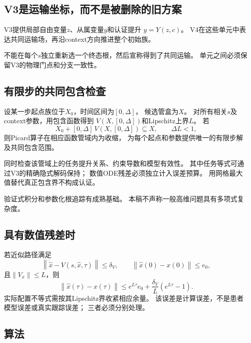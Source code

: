 \documentclass[UTF8,11pt,a4paper,fontset=fandol]{ctexart}
\numberwithin{equation}{section}
\theoremstyle{definition}
\newcommand{\norm}[1]{\left\lVert#1\right\rVert}
\begin{document}
\subsection{V3是运输坐标，而不是被删除的旧方案}

V3提供局部自由变量$z$、从属变量$y$和认证提升
$y=Y(z,c)$。
V4在这些单元中表达共同运输场，再沿context方向推进整个初始族。

不能在每个$s$独立重新选一个终态根，然后宣称得到了共同运输。
单元之间必须保留V3的物理门点和分支一致性。

\subsection{有限步的共同包含检查}

设某一步起点族位于$X_0$，时间区间为$[0,\Delta]$，
候选管盒为$X$。
对所有相关$s$及context参数，用包含函数得到
$V(X,[0,\Delta])$和Lipschitz上界$L$。
若
\begin{equation}
 \boxed{
 X_0+[0,\Delta]\,V(X,[0,\Delta])
 \subseteq X,\qquad
 \Delta L<1,
 }
 \label{eq:picard}
\end{equation}
则Picard算子在相应函数管域内为收缩，
为每个起点和参数提供唯一的有限步解及共同包含范围。

同时检查该管域上的任务提升关系、约束导数和模型有效性。
其中任务等式可通过V3的精确隐式解码保持；
数值ODE残差必须独立计入误差预算。
用网格最大值替代真正包含界不构成认证。

验证式积分和参数化根追踪有成熟基础\cite{duff}。
本稿不声称一般高维问题具有多项式复杂度。

\subsection{具有数值残差时}

若近似路径满足
\begin{equation}
 \norm{\dot{\widehat x}-V(s,\widehat x,\tau)}
 \leq\delta_V,
 \qquad \norm{\widehat x(0)-x(0)}\leq e_0,
\end{equation}
且$\norm{V_x}\leq L$，则
\begin{equation}
 \norm{\widehat x(\tau)-x(\tau)}
 \leq e^{L\tau}e_0+
 \frac{\delta_V}{L}(e^{L\tau}-1).
\end{equation}
实际配置不等式需按其Lipschitz界收紧相应余量。
该误差是计算误差，不是患者模型误差或真实跟踪误差；
三者必须分别处理。

\subsection{算法}
\end{document}
